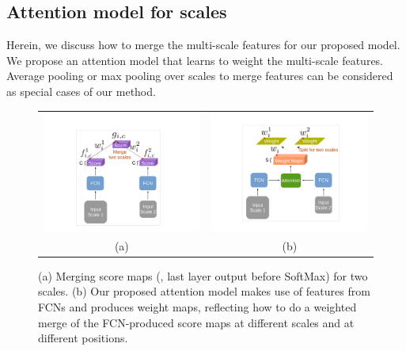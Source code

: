\subsection{Attention model for scales}

Herein, we discuss how to merge the multi-scale features for our proposed model. We propose an attention model that learns to weight the multi-scale features. Average pooling \cite{ciresan2012multi, dai2015boxsup} or max pooling \cite{felzenszwalb2010object, papandreou2014untangling} over scales to merge features can be considered as special cases of our method.

\begin{figure}
  \centering   
  \addtolength{\tabcolsep}{-5pt}       
  \begin{tabular}{cc}
   \includegraphics[height=0.53\linewidth]{fig/approach1_2.pdf} &
   \includegraphics[height=0.53\linewidth]{fig/approach2_2.pdf} \\
   (a)  &
   (b)  \\
  \end{tabular}
  \vspace{1pt}
  \caption{(a) Merging score maps (\ie, last layer output before SoftMax) for two scales. (b) Our proposed attention model makes use of features from FCNs and produces weight maps, reflecting how to do a weighted merge of the FCN-produced score maps at different scales and at different positions.}
  \label{fig:models}
\end{figure}  

